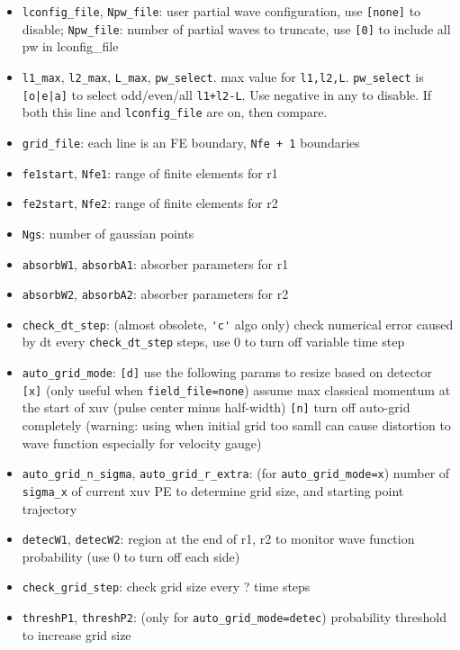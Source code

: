 
\begin{itemize}
\item \verb`lconfig_file`, \verb`Npw_file`: user partial wave configuration, use \verb`[none]` to disable; \verb`Npw_file`: number of partial waves to truncate, use \verb`[0]` to include all pw in lconfig_file
\item \verb`l1_max`, \verb`l2_max`, \verb`L_max`, \verb`pw_select`. max value for \verb`l1,l2,L`. \verb`pw_select` is \verb`[o|e|a]` to select odd/even/all \verb`l1+l2-L`. Use negative in any to disable. If both this line and \verb`lconfig_file` are on, then compare.
\item \verb`grid_file`: each line is an FE boundary, \verb`Nfe + 1` boundaries
\item \verb`fe1start`, \verb`Nfe1`: range of finite elements for r1
\item \verb`fe2start`, \verb`Nfe2`: range of finite elements for r2
\item \verb`Ngs`: number of gaussian points
\item \verb`absorbW1`, \verb`absorbA1`: absorber parameters for r1
\item \verb`absorbW2`, \verb`absorbA2`: absorber parameters for r2
\item \verb`check_dt_step`: (almost obsolete, \verb`'c'` algo only) check numerical error caused by dt every \verb`check_dt_step` steps, use 0 to turn off variable time step
\item \verb`auto_grid_mode`: \verb`[d]` use the following params to resize based on detector \verb`[x]` (only useful when \verb`field_file=none`) assume max classical momentum at the start of xuv (pulse center minus half-width) \verb`[n]` turn off auto-grid completely (warning: using when initial grid too samll can cause distortion to wave function especially for velocity gauge)
\item \verb`auto_grid_n_sigma`, \verb`auto_grid_r_extra`: (for \verb`auto_grid_mode=x`) number of \verb`sigma_x` of current xuv PE to determine grid size, and starting point trajectory
\item \verb`detecW1`, \verb`detecW2`: region at the end of r1, r2 to monitor wave function probability (use 0 to turn off each side)
\item \verb`check_grid_step`: check grid size every ? time steps
\item \verb`threshP1`, \verb`threshP2`: (only for \verb`auto_grid_mode=detec`) probability threshold to increase grid size

\end{itemize}
